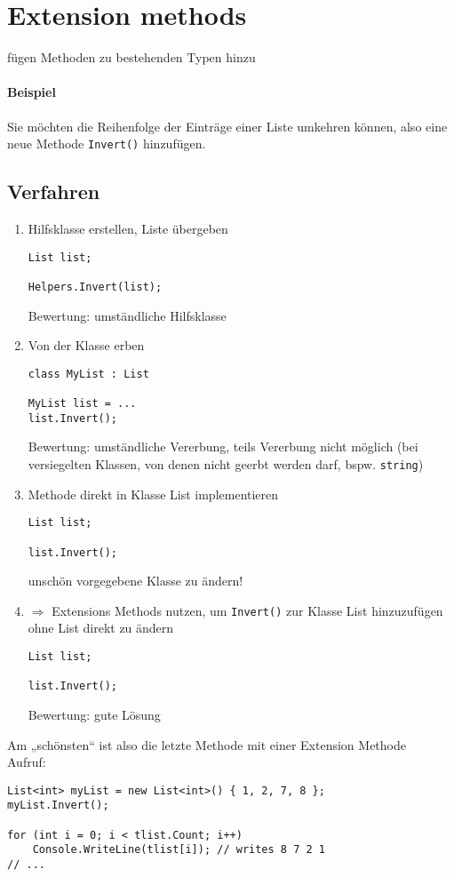 \section{Extension methods}
fügen Methoden zu bestehenden Typen hinzu
\paragraph{Beispiel} Sie möchten die Reihenfolge der Einträge einer Liste umkehren können, also eine neue Methode \lstinline`Invert()` hinzufügen.
\subsection{Verfahren}
\begin{enumerate}
\item Hilfsklasse erstellen, Liste übergeben
\begin{lstlisting}[language={[Sharp]C}]
List list;

Helpers.Invert(list);
\end{lstlisting}
Bewertung: umständliche Hilfsklasse
\item Von der Klasse erben
\begin{lstlisting}[language={[Sharp]C}]
class MyList : List

MyList list = ...
list.Invert();
\end{lstlisting}
Bewertung: umständliche Vererbung, teils Vererbung nicht möglich (bei versiegelten Klassen, von denen nicht geerbt werden darf, bspw. \lstinline`string`)
\item Methode direkt in Klasse List implementieren
\begin{lstlisting}[language={[Sharp]C}]
List list;

list.Invert();
\end{lstlisting}
unschön vorgegebene Klasse zu ändern!
\item $\Rightarrow$ Extensions Methods nutzen, um \lstinline`Invert()` zur Klasse List hinzuzufügen ohne List direkt zu ändern
\begin{lstlisting}[language={[Sharp]C}]
List list;

list.Invert();
\end{lstlisting}
Bewertung: gute Lösung
\end{enumerate}
Am „schönsten“ ist also die letzte Methode mit einer Extension Methode\\
Aufruf:
\begin{lstlisting}[language={[Sharp]C}]
List<int> myList = new List<int>() { 1, 2, 7, 8 }; 
myList.Invert(); 

for (int i = 0; i < tlist.Count; i++)  
	Console.WriteLine(tlist[i]); // writes 8 7 2 1 
// ...
\end{lstlisting}
